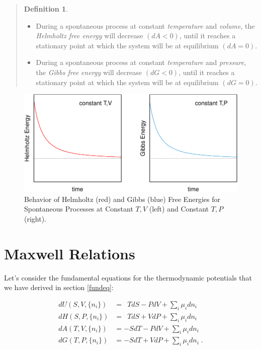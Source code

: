 \documentclass[
  9pt,
]{extbook}
\providecommand{\tightlist}{%
  \setlength{\itemsep}{0pt}\setlength{\parskip}{0pt}}
\theoremstyle{definition}
\newtheorem{definition}{Definition}[chapter]
\theoremstyle{definition}
\theoremstyle{definition}
\theoremstyle{remark}
\begin{document}
\begin{quote}
\begin{definition}
\protect\hypertarget{def:helmgibbsminimum}{}{\label{def:helmgibbsminimum} }\(\;\)

\begin{itemize}
\tightlist
\item
  During a spontaneous process at constant \emph{temperature} and \emph{volume}, the \emph{Helmholtz free energy} will decrease \((dA<0)\), until it reaches a stationary point at which the system will be at equilibrium \((dA=0)\).
\item
  During a spontaneous process at constant \emph{temperature} and \emph{pressure}, the \emph{Gibbs free energy} will decrease \((dG<0)\), until it reaches a stationary point at which the system will be at equilibrium \((dG=0)\).
\end{itemize}
\end{definition}
\end{quote}

\begin{figure}

{\centering \includegraphics{pchem1_files/figure-latex/agfig-1} 

}

\caption{Behavior of Helmholtz (red) and Gibbs (blue) Free Energies for Spontaneous Processes at Constant $T,V$ (left) and Constant $T,P$ (right).}\label{fig:agfig}
\end{figure}

\hypertarget{maxwell}{%
\section{Maxwell Relations}\label{maxwell}}

Let's consider the fundamental equations for the thermodynamic potentials that we have derived in section \ref{fundeq}:

\begin{equation}
\begin{aligned}
dU(S,V,\{n_i\}) &= \enspace T dS -P dV + \sum_i \mu_i dn_i \\
dH(S,P,\{n_i\}) &= \enspace T dS + V dP + \sum_i \mu_i dn_i \\
dA(T,V,\{n_i\}) &= -S dT -P dV + \sum_i \mu_i dn_i \\
dG(T,P,\{n_i\}) &= -S dT + V dP + \sum_i \mu_i dn_i\;.
\end{aligned}
\label{eq:dhagchem1}
\end{equation}
\end{document}
